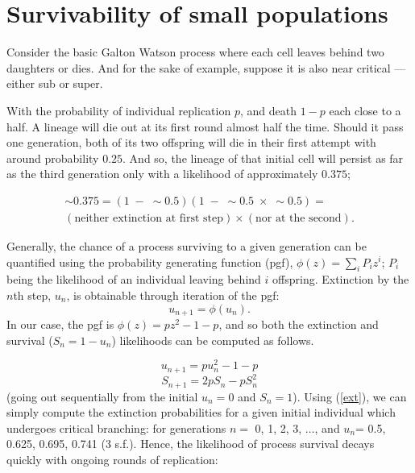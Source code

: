 



\section{Survivability of small populations}
Consider the basic Galton Watson process where each cell leaves behind two daughters or dies. And for the sake of example, suppose it is also near critical --- either sub or super.\par With the probability of individual replication $p$, and death $1-p$ each close to a half. A lineage will die out at its first round almost half the time. Should it pass one generation, both of its two offspring will die in their first attempt with around probability $0.25$. And so, the lineage of that initial cell will persist as far as the third generation only with a likelihood of approximately $0.375$;

\begin{multline}
\sim0.375 = (1\;-\;\sim0.5)(1\;-\;\sim0.5\;\times\;\sim0.5) =\\ (\text{neither extinction at first step})\times(\text{nor at the second}).
\end{multline}

\noindent
Generally, the chance of a process surviving to a given generation can be quantified using the probability generating function (pgf), $\phi(z) = \sum_i P_i z^i$; $P_i$ being the likelihood of an individual leaving behind $i$ offspring. Extinction by the $n$th step, $u_n$, is obtainable through iteration of the pgf:
$$u_{n+1} = \phi(u_n).$$
In our case, the pgf is $\phi(z) = pz^2 - 1-p$, and so both the extinction and survival ($S_n = 1-u_n$) likelihoods can be computed as follows. 

\begin{equation}
\label{ext}
u_{n+1} = pu_n^2 - 1-p
\end{equation} 
$$S_{n+1} = 2pS_n - p S_n^2$$
(going out sequentially from the initial $u_n = 0$ and $S_n = 1$). Using (\ref{ext}), we can simply compute the extinction probabilities for a given initial individual which undergoes critical branching: for generations $n=$ 0, 1, 2, 3, $\dots$, and $u_n$= 0.5, 0.625, 0.695, 0.741 (3 s.f.). Hence, the likelihood of process survival decays quickly with ongoing rounds of replication:

